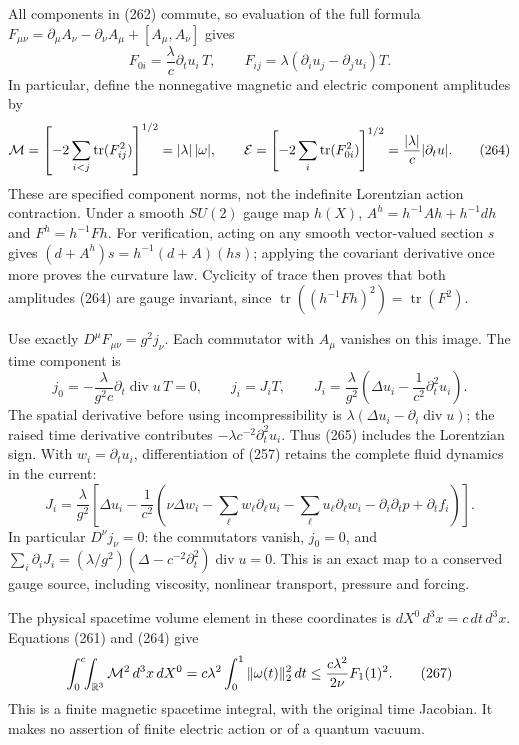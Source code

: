\documentclass[
  11pt,
]{article}
\begin{document}
All components in (262) commute, so evaluation of the full formula
\(F_{\mu\nu}=\partial_\mu A_\nu-\partial_\nu A_\mu+[A_\mu,A_\nu]\) gives
\[
 F_{0i}=\frac{\lambda}{c}\partial_tu_i\,T,\qquad
 F_{ij}=\lambda(\partial_i u_j-\partial_j u_i)T.
 \tag{263}
\] In particular, define the nonnegative magnetic and electric component
amplitudes by \[
 {\cal M}=\left[-2\sum_{i<j}\operatorname{tr}(F_{ij}^2)\right]^{1/2}
 =|\lambda|\,|\omega|,\qquad
 {\cal E}=\left[-2\sum_i\operatorname{tr}(F_{0i}^2)\right]^{1/2}
 =\frac{|\lambda|}{c}|\partial_tu|.
 \tag{264}
\] These are specified component norms, not the indefinite Lorentzian
action contraction. Under a smooth \(SU(2)\) gauge map \(h(X)\),
\(A^h=h^{-1}Ah+h^{-1}dh\) and \(F^h=h^{-1}Fh\). For verification, acting
on any smooth vector-valued section \(s\) gives
\((d+A^h)s=h^{-1}(d+A)(hs)\); applying the covariant derivative once
more proves the curvature law. Cyclicity of trace then proves that both
amplitudes (264) are gauge invariant, since
\(\operatorname{tr}((h^{-1}Fh)^2)=\operatorname{tr}(F^2)\).

Use exactly \(D^\mu F_{\mu\nu}=g^2j_\nu\). Each commutator with
\(A_\mu\) vanishes on this image. The time component is \[
 j_0=-\frac{\lambda}{g^2c}\partial_t\operatorname{div}u\,T=0,
 \qquad
 j_i=J_iT,\qquad
 J_i=\frac{\lambda}{g^2}
       \left(\Delta u_i-\frac1{c^2}\partial_t^2u_i\right).
 \tag{265}
\] The spatial derivative before using incompressibility is
\(\lambda(\Delta u_i-\partial_i\operatorname{div}u)\); the raised time
derivative contributes \(-\lambda c^{-2}\partial_t^2u_i\). Thus (265)
includes the Lorentzian sign. With \(w_i=\partial_tu_i\),
differentiation of (257) retains the complete fluid dynamics in the
current: \[
 J_i=\frac{\lambda}{g^2}
 \left[\Delta u_i-\frac1{c^2}
 \left(\nu\Delta w_i-\sum_\ell w_\ell\partial_\ell u_i
 -\sum_\ell u_\ell\partial_\ell w_i
 -\partial_i\partial_t p+\partial_t f_i\right)\right].
 \tag{266}
\] In particular \(D^\nu j_\nu=0\): the commutators vanish, \(j_0=0\),
and \(\sum_i\partial_iJ_i=(\lambda/g^2)
(\Delta-c^{-2}\partial_t^2)\operatorname{div}u=0\). This is an exact map
to a conserved gauge source, including viscosity, nonlinear transport,
pressure and forcing.

The physical spacetime volume element in these coordinates is
\(dX^0\,d^3x=c\,dt\,d^3x\). Equations (261) and (264) give \[
 \int_0^c\!\!\int_{\mathbb R^3}{\cal M}^2\,d^3x\,dX^0
 =c\lambda^2\int_0^1\|\omega(t)\|_2^2\,dt
 \le\frac{c\lambda^2}{2\nu}F_1(1)^2 .
 \tag{267}
\] This is a finite magnetic spacetime integral, with the original time
Jacobian. It makes no assertion of finite electric action or of a
quantum vacuum.
\end{document}
